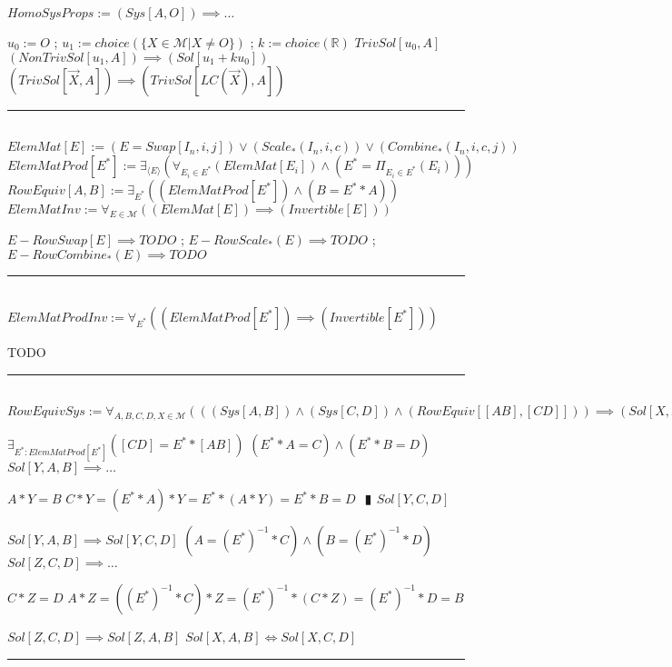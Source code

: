 \documentclass{book}
\newcommand{\abr}{:=}
\newcommand{\pipe}{$\phantom{(}\vrectangleblack\phantom{)}$}
\begin{document}
$HomoSysProps \abr (Sys[A, O]) \implies \ldots$
\begin{enumerate}
  \lit $u_0 \abr O$ ; $u_1 \abr choice(\{X \in \mathcal{M} | X \neq O\})$ ; $k \abr choice(\mathbb{R})$
  \lit $TrivSol[u_0, A]$
  \lit $(NonTrivSol[u_1, A]) \implies (Sol[u_1 + k u_0])$
  \lit $(TrivSol[\overrightarrow{X}, A]) \implies (TrivSol[LC(\overrightarrow{X}), A])$
\end{enumerate} \vspace{.75mm} \hrule \vspace{.75mm} \ \\ 

$ElemMat[E] \abr (E = Swap[I_n, i, j]) \lor (Scale_*(I_n, i, c)) \lor (Combine_*(I_n, i, c, j))$ \\
$ElemMatProd[E^*] \abr \exists_{\langle E \rangle}(\forall_{E_i \in E^*}(ElemMat[E_i]) \land (E^* = \Pi_{E_i \in E^*}(E_i)))$ \\
$RowEquiv[A, B] \abr \exists_{E^*}((ElemMatProd[E^*]) \land (B = E^* * A))$ \\

$ElemMatInv \abr \forall_{E \in \mathcal{M}}((ElemMat[E]) \implies (Invertible[E]))$
\begin{enumerate}
  \lit $E-RowSwap[E] \implies TODO$ ; $E-RowScale_*(E) \implies TODO$ ; $E-RowCombine_*(E) \implies TODO$
\end{enumerate} \vspace{.75mm} \hrule \vspace{.75mm} \ \\ 

$ElemMatProdInv \abr \forall_{E^*}((ElemMatProd[E^*]) \implies (Invertible[E^*]))$
\begin{enumerate}
  \lit TODO
\end{enumerate} \vspace{.75mm} \hrule \vspace{.75mm} \ \\ 

$RowEquivSys \abr \forall_{A, B, C, D, X \in \mathcal{M}}(((Sys[A, B]) \land (Sys[C, D]) \land (RowEquiv[[A B], [C D]])) \implies (Sol[X, A, B] \iff Sol[X, C, D]))$
\begin{enumerate}
  \lit $\exists_{E^* : ElemMatProd[E^*]}([C D] = E^* * [A B])$
  \lit $(E^* * A = C) \land (E^* * B = D)$
  \lit $Sol[Y, A, B] \implies \ldots$
  \begin{enumerate}
    \lit $A * Y = B$
    \lit $C * Y = (E^* * A) * Y = E^* * (A * Y) = E^* * B = D$ \pipe $Sol[Y, C, D]$
  \end{enumerate}
  \lit $Sol[Y, A, B] \implies Sol[Y, C, D]$
  \lit $(A = (E^*)^{-1} * C) \land (B = (E^*)^{-1} * D)$
  \lit $Sol[Z, C, D] \implies \ldots$
  \begin{enumerate}
    \lit $C * Z = D$
    \lit $A * Z = ((E^*)^{-1} * C) * Z = (E^*)^{-1} * (C * Z) = (E^*)^{-1} * D = B$
  \end{enumerate}
  \lit $Sol[Z, C, D] \implies Sol[Z, A, B]$
  \lit $Sol[X, A, B] \iff Sol[X, C, D]$
\end{enumerate} \vspace{.75mm} \hrule \vspace{.75mm} \ \\ 
\end{document}
